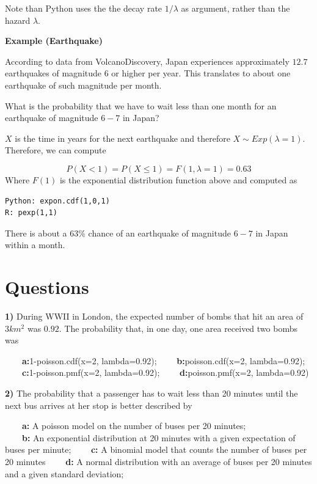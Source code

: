 \documentclass[
]{book}
\begin{document}
Note than Python uses the the decay rate \(1/\lambda\) as argument, rather than the hazard \(\lambda\).

\textbf{Example (Earthquake)}

According to data from VolcanoDiscovery, Japan experiences approximately \(12.7\) earthquakes of magnitude \(6\) or higher per year. This translates to about one earthquake of such magnitude per month.

What is the probability that we have to wait less than one month for an earthquake of magnitude \(6-7\) in Japan?

\(X\) is the time in years for the next earthquake and therefore \(X \sim Exp(\lambda=1)\). Therefore, we can compute

\[P(X < 1)= P(X \le 1) = F(1,\lambda=1)=0.63\]
Where \(F(1)\) is the exponential distribution function above and computed as

\begin{verbatim}
Python: expon.cdf(1,0,1)
R: pexp(1,1)
\end{verbatim}

There is about a \(63\%\) chance of an earthquake of magnitude \(6-7\) in Japan within a month.

\hypertarget{questions-5}{%
\section{Questions}\label{questions-5}}

\textbf{1)} During WWII in London, the expected number of bombs that hit an area of \(3km^2\) was \(0.92\). The probability that, in one day, one area received two bombs was

\textbf{\(\qquad\)a:}1-poisson.cdf(x=2, lambda=0.92);
\textbf{\(\qquad\)b:}poisson.cdf(x=2, lambda=0.92); \textbf{\(\qquad\)c:}1-poisson.pmf(x=2, lambda=0.92); \textbf{\(\qquad\)d:}poisson.pmf(x=2, lambda=0.92)

\textbf{2)} The probability that a passenger has to wait less than 20 minutes until the next bus arrives at her stop is better described by

\textbf{\(\qquad\)a:} A poisson model on the number of buses per 20 minutes;\\
\textbf{\(\qquad\)b:} An exponential distribution at 20 minutes with a given expectation of buses per minute;
\textbf{\(\qquad\)c:} A binomial model that counts the number of buses per 20 minutes
\textbf{\(\qquad\)d:} A normal distribution with an average of buses per 20 minutes and a given standard deviation;
\end{document}
